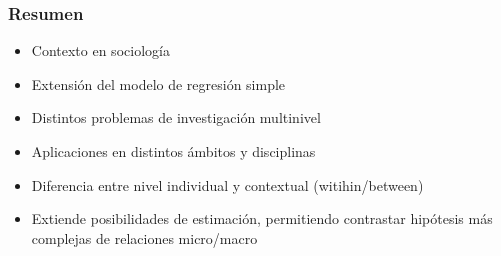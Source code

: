 \documentclass[]{beamer} %
\begin{document}
	\begin{frame}%
		\frametitle{Resumen}
		\begin{itemize}%
			\item Contexto en sociología
			\item Extensión del modelo de regresión simple
			\item Distintos problemas de investigación multinivel
			\item Aplicaciones en distintos ámbitos y disciplinas
			\item Diferencia entre nivel individual y contextual (witihin/between)
			\item Extiende posibilidades de estimación, permitiendo contrastar hipótesis más complejas de relaciones micro/macro
		\end{itemize}
	\end{frame}


\end{document}

